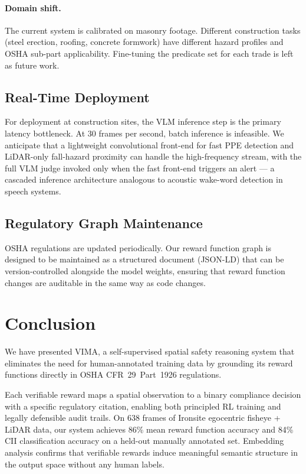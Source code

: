 \documentclass[sigconf,nonacm]{acmart}
\begin{document}
\paragraph{Domain shift.}
The current system is calibrated on masonry footage.
Different construction tasks (steel erection, roofing, concrete
formwork) have different hazard profiles and OSHA sub-part applicability.
Fine-tuning the predicate set for each trade is left as future work.

\subsection{Real-Time Deployment}

For deployment at construction sites, the VLM inference step is the
primary latency bottleneck.
At 30 frames per second, batch inference is infeasible.
We anticipate that a lightweight convolutional front-end for fast
PPE detection and LiDAR-only fall-hazard proximity can handle the
high-frequency stream, with the full VLM judge invoked only when the
fast front-end triggers an alert --- a cascaded inference architecture
analogous to acoustic wake-word detection in speech systems.

\subsection{Regulatory Graph Maintenance}

OSHA regulations are updated periodically.
Our reward function graph is designed to be maintained as a structured
document (JSON-LD) that can be version-controlled alongside the model
weights, ensuring that reward function changes are auditable in the same
way as code changes.

\section{Conclusion}
\label{sec:conclusion}

We have presented VIMA, a self-supervised spatial safety reasoning system
that eliminates the need for human-annotated training data by grounding
its reward functions directly in OSHA CFR~29~Part~1926 regulations.

Each verifiable reward maps a spatial observation to a binary compliance
decision with a specific regulatory citation, enabling both principled
RL training and legally defensible audit trails.
On 638 frames of Ironsite egocentric fisheye + LiDAR data, our system
achieves 86\% mean reward function accuracy and 84\% CII classification
accuracy on a held-out manually annotated set.
Embedding analysis confirms that verifiable rewards induce meaningful
semantic structure in the output space without any human labels.
\end{document}
